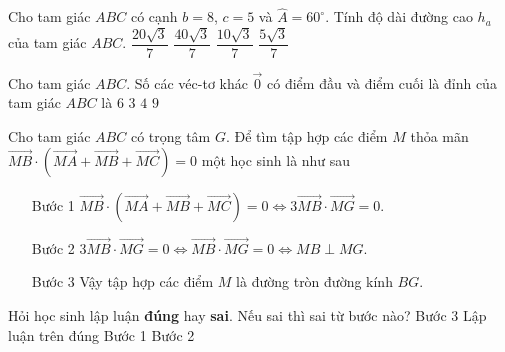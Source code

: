 \begin{ex}%
	Cho tam giác $ABC$ có cạnh $b=8$, $c=5$ và $\widehat{A}=60^{\circ}$. Tính độ dài đường cao $h_a$ của tam giác $ABC$.
	\choice
	{\True $\dfrac{20\sqrt{3}}{7}$}
	{$\dfrac{40\sqrt{3}}{7}$}
	{$\dfrac{10\sqrt{3}}{7}$}
	{$\dfrac{5\sqrt{3}}{7}$}
\end{ex}

\begin{ex}%
	Cho tam giác $ABC$. Số các véc-tơ khác $\overrightarrow{0}$ có điểm đầu và điểm cuối là đỉnh của tam giác $ABC$ là
	\choice
	{\True $6$}
	{$3$}
	{$4$}
	{$9$}
\end{ex}

\begin{ex}%
	Cho tam giác $ABC$ có trọng tâm $G$. Để tìm tập hợp các điểm $M$ thỏa mãn $\overrightarrow{MB} \cdot \left( \overrightarrow{MA}+\overrightarrow{MB}+\overrightarrow{MC}\right)=0$ một học sinh là như sau
	\begin{itemize}
		\item[Bước 1] $\overrightarrow{MB} \cdot \left( \overrightarrow{MA}+\overrightarrow{MB}+\overrightarrow{MC}\right)=0 \Leftrightarrow 3\overrightarrow{MB} \cdot \overrightarrow{MG}=0$.
		\item[Bước 2] $3\overrightarrow{MB} \cdot \overrightarrow{MG}=0 \Leftrightarrow \overrightarrow{MB} \cdot \overrightarrow{MG}=0 \Leftrightarrow MB \perp MG$.
		\item[Bước 3] Vậy tập hợp các điểm $M$ là đường tròn đường kính $BG$.
	\end{itemize}
Hỏi học sinh lập luận \textbf{đúng} hay \textbf{sai}. Nếu sai thì sai từ bước nào?
	\choice
	{Bước 3}
	{\True Lập luận trên đúng}
	{Bước 1}
	{Bước 2}
\end{ex}



